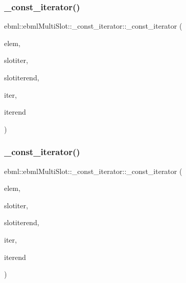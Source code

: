 \subsubsection{\texorpdfstring{\+\_\+const\+\_\+iterator()}{\_const\_iterator()}\hspace{0.1cm}{\footnotesize\ttfamily [1/3]}}
{\footnotesize\ttfamily ebml\+::ebml\+Multi\+Slot\+::\+\_\+const\+\_\+iterator\+::\+\_\+const\+\_\+iterator (\begin{DoxyParamCaption}\item[{const \mbox{\hyperlink{namespaceebml_a2deef4e8071531b32e3533f1bf978917}{c\+\_\+ebml\+Element\+\_\+sp}} \&}]{elem,  }\item[{const std\+::vector$<$ \+\_\+slot\+\_\+t $>$\+::const\+\_\+iterator \&}]{slotiter,  }\item[{const std\+::vector$<$ \+\_\+slot\+\_\+t $>$\+::const\+\_\+iterator \&}]{slotiterend,  }\item[{const \mbox{\hyperlink{classebml_1_1const__slot__t_1_1iterator}{const\+\_\+slot\+\_\+t\+::iterator}} \&}]{iter,  }\item[{const \mbox{\hyperlink{classebml_1_1const__slot__t_1_1iterator}{const\+\_\+slot\+\_\+t\+::iterator}} \&}]{iterend }\end{DoxyParamCaption})\hspace{0.3cm}{\ttfamily [protected]}}

\mbox{\label{classebml_1_1ebmlMultiSlot_1_1__const__iterator_a681e9596c1ae982f3c482548cb16333d}} 
\subsubsection{\texorpdfstring{\+\_\+const\+\_\+iterator()}{\_const\_iterator()}\hspace{0.1cm}{\footnotesize\ttfamily [2/3]}}
{\footnotesize\ttfamily ebml\+::ebml\+Multi\+Slot\+::\+\_\+const\+\_\+iterator\+::\+\_\+const\+\_\+iterator (\begin{DoxyParamCaption}\item[{\mbox{\hyperlink{namespaceebml_a2deef4e8071531b32e3533f1bf978917}{c\+\_\+ebml\+Element\+\_\+sp}} \&\&}]{elem,  }\item[{std\+::vector$<$ \+\_\+slot\+\_\+t $>$\+::const\+\_\+iterator \&\&}]{slotiter,  }\item[{std\+::vector$<$ \+\_\+slot\+\_\+t $>$\+::const\+\_\+iterator \&\&}]{slotiterend,  }\item[{\mbox{\hyperlink{classebml_1_1const__slot__t_1_1iterator}{const\+\_\+slot\+\_\+t\+::iterator}} \&\&}]{iter,  }\item[{\mbox{\hyperlink{classebml_1_1const__slot__t_1_1iterator}{const\+\_\+slot\+\_\+t\+::iterator}} \&\&}]{iterend }\end{DoxyParamCaption})\hspace{0.3cm}{\ttfamily [protected]}}

